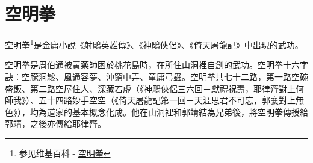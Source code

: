 \chapter{空明拳}
空明拳\footnote{参见维基百科 - \href{http://zh.wikipedia.org/wiki/\%E7\%A9\%BA\%E6\%98\%8E\%E6\%8B\%B3}{空明拳}}是金庸小說《射鵰英雄傳》、《神鵰俠侶》、《倚天屠龍記》中出現的武功。

空明拳是周伯通被黃藥師困於桃花島時，在所住山洞裡自創的武功。空明拳十六字訣：空朦洞鬆、風通容夢、沖窮中弄、童庸弓蟲。空明拳共七十二路，第一路空碗盛飯、第二路空屋住人、深藏若虛（《神鵰俠侶三六回－獻禮祝壽，耶律齊對上何師我》）、五十四路妙手空空（《倚天屠龍記第一回－天涯思君不可忘，郭襄對上無色》），均為道家的基本概念化成。他在山洞裡和郭靖結為兄弟後，將空明拳傳授給郭靖，之後亦傳給耶律齊。

